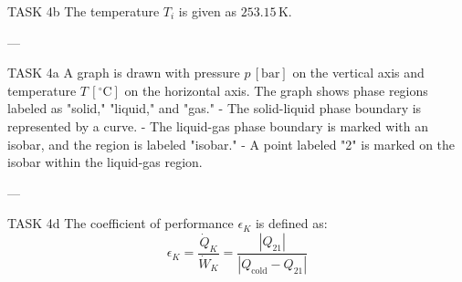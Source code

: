 TASK 4b  
The temperature \( T_i \) is given as \( 253.15 \, \text{K} \).

---

TASK 4a  
A graph is drawn with pressure \( p \, [\text{bar}] \) on the vertical axis and temperature \( T \, [^\circ\text{C}] \) on the horizontal axis. The graph shows phase regions labeled as "solid," "liquid," and "gas."  
- The solid-liquid phase boundary is represented by a curve.  
- The liquid-gas phase boundary is marked with an isobar, and the region is labeled "isobar."  
- A point labeled "2" is marked on the isobar within the liquid-gas region.  

---

TASK 4d  
The coefficient of performance \( \epsilon_K \) is defined as:  
\[
\epsilon_K = \frac{\dot{Q}_K}{\dot{W}_K} = \frac{|Q_{21}|}{|Q_{\text{cold}} - Q_{21}|}
\]